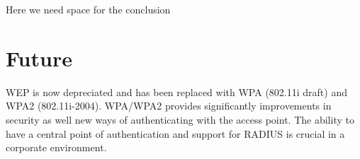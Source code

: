 \documentclass[twocolumn]{IEEEtran}
\begin{document}
Here we need space for the conclusion



\section {Future}
\label{sec:future}

WEP is now depreciated and has been replaced with WPA (802.11i draft) and WPA2 (802.11i-2004). WPA/WPA2 provides significantly improvements in security as well new ways of authenticating with the access point. The ability to have a central point  of authentication and support for RADIUS is crucial in a corporate environment.






\end{document}
